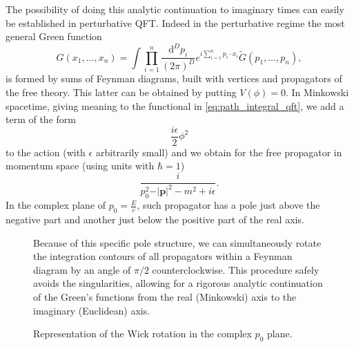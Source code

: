 The possibility of doing this analytic continuation to imaginary times can easily be established in perturbative QFT. Indeed in the perturbative regime the most general Green function
\[
    G(x_1, \dots, x_n) = \int \prod_{i=1}^n \frac{\mathrm{d}^D p_i}{(2 \pi)^D} e^{i \sum_{i=1}^n p_i \cdot x_i} \tilde{G}(p_1, \dots, p_n),
\]
is formed by sums of Feynman diagrams, built with vertices and propagators of the free theory. This latter can be obtained by putting \(V(\phi)=0\). In Minkowski spacetime, giving meaning to the functional in \eqref{eq:path_integral_qft}, we add a term of the form
\[
    \frac{i \epsilon}{2}\phi^2
\]
to the action (with \(\epsilon\) arbitrarily small) and we obtain for the free propagator in momentum space (using units with \(\hbar=1\))
\[
    \frac{i}{p_0^2 - \vert \mathbf{p} \vert^2 - m^2 + i \epsilon}.
\]
In the complex plane of \(p_0 = \tfrac{E}{c}\), such propagator has a pole just above the negative part and another just below the positive part of the real axis.
\begin{figure}[H]
    \centering
    \begin{minipage}{0.5\textwidth}
        \centering
    \end{minipage}\hfill
    \begin{minipage}{0.45\textwidth}
        Because of this specific pole structure, we can simultaneously rotate the integration contours of all propagators within a Feynman diagram by an angle of $\pi/2$ counterclockwise. This procedure safely avoids the singularities, allowing for a rigorous analytic continuation of the Green's functions from the real (Minkowski) axis to the imaginary (Euclidean) axis.
    \end{minipage}
    \caption{Representation of the Wick rotation in the complex $p_0$ plane.}
    \label{fig:wick_rotation}
\end{figure}
